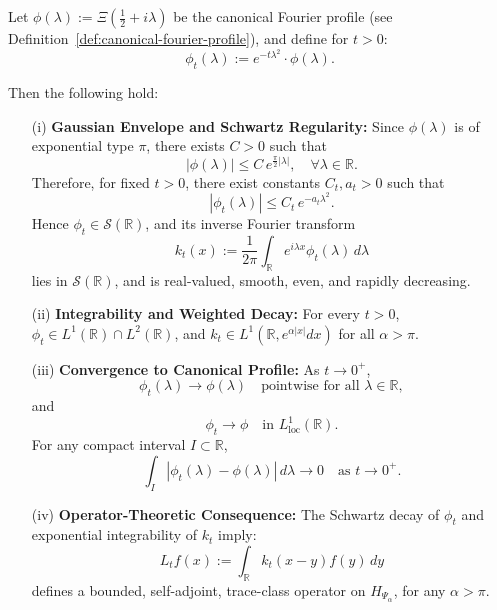 \begin{lemma}
\label{lem:mollified_profile_decay}
Let \( \phi(\lambda) := \Xi\left( \tfrac{1}{2} + i\lambda \right) \) be the canonical Fourier profile (see Definition~\ref{def:canonical-fourier-profile}), and define for \( t > 0 \):
\[
\phi_t(\lambda) := e^{-t\lambda^2} \cdot \phi(\lambda).
\]

Then the following hold:

\begin{enumerate}
    \item[\textnormal{(i)}] \textbf{Gaussian Envelope and Schwartz Regularity:} Since \( \phi(\lambda) \) is of exponential type \( \pi \), there exists \( C > 0 \) such that
    \[
    |\phi(\lambda)| \le C\, e^{\frac{\pi}{2}|\lambda|}, \quad \forall \lambda \in \mathbb{R}.
    \]
    Therefore, for fixed \( t > 0 \), there exist constants \( C_t, a_t > 0 \) such that
    \[
    |\phi_t(\lambda)| \le C_t\, e^{-a_t \lambda^2}.
    \]
    Hence \( \phi_t \in \mathcal{S}(\mathbb{R}) \), and its inverse Fourier transform
    \[
    k_t(x) := \frac{1}{2\pi} \int_{\mathbb{R}} e^{i\lambda x} \phi_t(\lambda)\, d\lambda
    \]
    lies in \( \mathcal{S}(\mathbb{R}) \), and is real-valued, smooth, even, and rapidly decreasing.

    \item[\textnormal{(ii)}] \textbf{Integrability and Weighted Decay:} For every \( t > 0 \), \( \phi_t \in L^1(\mathbb{R}) \cap L^2(\mathbb{R}) \), and \( k_t \in L^1(\mathbb{R}, e^{\alpha |x|} dx) \) for all \( \alpha > \pi \).

    \item[\textnormal{(iii)}] \textbf{Convergence to Canonical Profile:} As \( t \to 0^+ \),
    \[
    \phi_t(\lambda) \to \phi(\lambda) \quad \text{pointwise for all } \lambda \in \mathbb{R},
    \]
    and
    \[
    \phi_t \to \phi \quad \text{in } L^1_{\mathrm{loc}}(\mathbb{R}).
    \]
    For any compact interval \( I \subset \mathbb{R} \),
    \[
    \int_I |\phi_t(\lambda) - \phi(\lambda)|\, d\lambda \to 0 \quad \text{as } t \to 0^+.
    \]

    \item[\textnormal{(iv)}] \textbf{Operator-Theoretic Consequence:} The Schwartz decay of \( \phi_t \) and exponential integrability of \( k_t \) imply:
    \[
    L_t f(x) := \int_{\mathbb{R}} k_t(x - y) f(y)\, dy
    \]
    defines a bounded, self-adjoint, trace-class operator on \( H_{\Psi_\alpha} \), for any \( \alpha > \pi \).
\end{enumerate}
\end{lemma}
% 